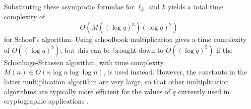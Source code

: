 Substituting these asymptotic formulae for $\ell_k$ and $k$ yields a total time complexity of
\[
O(M((\log q)^3) (\log q)^2)
\]
for Schoof's algorithm. Using schoolbook multiplication gives a time complexity of $O((\log q)^8)$, but this can be brought down to $\tilde{O}((\log q)^5)$ if the Sch\"onhage-Strassen algorithm, with time complexity $M(n) \in O(n \log n \log \log n)$, is used instead. However, the constants in the latter multiplication algorithm are very large, so that other multiplication algorithms are typically more efficient for the values of $q$ currently used in cryptographic applications \citep{Sutherland}.

